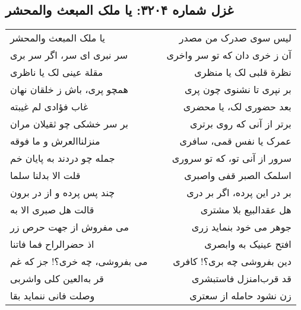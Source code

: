 \begin{center}
\section*{غزل شماره ۳۲۰۴: یا ملک المبعث والمحشر}
\label{sec:3204}
\begin{longtable}{l p{0.5cm} r}
یا ملک المبعث والمحشر
&&
لیس سوی صدرک من مصدر
\\
سر نبری ای سر، اگر سر بری
&&
آن ز خری دان که تو سر واخری
\\
مقلة عینی لک یا ناظری
&&
نظرة قلبی لک یا منظری
\\
همچو پری، باش ز خلقان نهان
&&
بر نپری تا نشنوی چون پری
\\
غاب فؤادی لم غیبته
&&
بعد حضوری لک، یا محضری
\\
بر سر خشکی چو ثقیلان مران
&&
برتر از آنی که روی برتری
\\
منزلناالعرش و ما فوقه
&&
عمرک یا نفس قمی، سافری
\\
جمله چو دردند به پایان خم
&&
سرور از آنی تو، که تو سروری
\\
قلت الا بدلنا سلما
&&
اسلمک الصبر قفی واصبری
\\
چند پس پرده و از در برون
&&
بر در این پرده، اگر بر دری
\\
قالت هل صبری الا به
&&
هل عقدالبیع بلا مشتری
\\
می مفروش از جهت حرص زر
&&
جوهر می خود بنماید زری
\\
اذ حضرالراح فما فاتنا
&&
افتح عینیک به وابصری
\\
می بفروشی، چه خری؟! جز که غم
&&
دین بفروشی چه بری؟! کافری
\\
قر به‌العین کلی واشربی
&&
قد قرب‌امنزل فاستبشری
\\
وصلت فانی ننماید بقا
&&
زن نشود حامله از سعتری
\\
\end{longtable}
\end{center}
